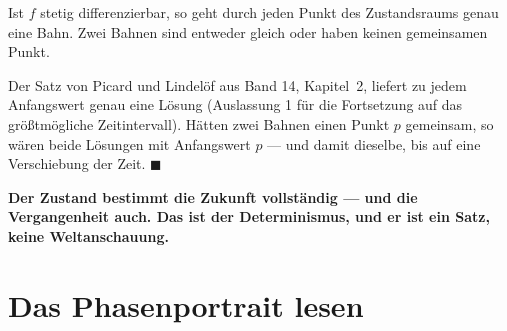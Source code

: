 \begin{merksatz}
Ist $f$ stetig differenzierbar, so geht durch jeden Punkt des Zustandsraums genau eine Bahn. Zwei Bahnen sind entweder gleich oder haben keinen gemeinsamen Punkt.

Der Satz von Picard und Lindelöf aus Band 14, Kapitel~2, liefert zu jedem Anfangswert genau eine Lösung (Auslassung 1 für die Fortsetzung auf das größtmögliche Zeitintervall). Hätten zwei Bahnen einen Punkt $p$ gemeinsam, so wären beide Lösungen mit Anfangswert $p$ --- und damit dieselbe, bis auf eine Verschiebung der Zeit. $\blacksquare$

\begin{center}
\begin{minipage}{0.9\textwidth}
\textbf{Der Zustand bestimmt die Zukunft vollständig --- und die Vergangenheit auch. Das ist der Determinismus, und er ist ein Satz, keine Weltanschauung.}
\end{minipage}
\end{center}

\begin{center}
\begin{minipage}{0.88\textwidth}
\end{minipage}
\end{center}
\end{merksatz}

\section{Das Phasenportrait lesen}


